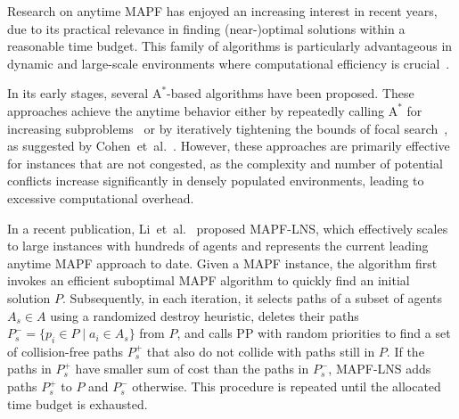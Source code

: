 \documentclass[runningheads]{llncs}
\begin{document}
Research on anytime MAPF has enjoyed an increasing interest in recent years, due to its practical relevance in finding (near-)optimal solutions within a reasonable time budget. This family of algorithms is particularly advantageous in dynamic and large-scale environments where computational efficiency is crucial~\cite{vedder-2021}. 

In its early stages, several $\mathrm{A}^*$-based algorithms have been proposed. These approaches achieve the anytime behavior either by repeatedly calling $\mathrm{A}^*$ for increasing subproblems~\cite{standley-2011,vedder-2021} or by iteratively tightening the bounds of focal search~\cite{pearl-1982}, as suggested by Cohen~et~al.~\cite{cohen-2018}. However, these approaches are primarily effective for instances that are not congested, as the complexity and number of potential conflicts increase significantly in densely populated environments, leading to excessive computational overhead.

In a recent publication, Li~et~al.~\cite{li-2021} proposed MAPF-LNS, which effectively scales to large instances with hundreds of agents and represents the current leading anytime MAPF approach to date. Given a MAPF instance, the algorithm first invokes an efficient suboptimal MAPF algorithm to quickly find an initial solution $P$. Subsequently, in each iteration, it selects paths of a subset of agents $A_s \in A$ using a randomized destroy heuristic, deletes their paths $P^-_s = \{p_i \in P \; | \; a_i \in A_s\}$ from $P$, and calls PP with random priorities to find a set of collision-free paths $P^+_s$ that also do not collide with paths still in $P$. If the paths in $P^+_s$ have smaller sum of cost than the paths in $P^-_s$, MAPF-LNS adds paths $P^+_s$ to $P$ and $P^-_s$ otherwise. This procedure is repeated until the allocated time budget is exhausted.
\end{document}
